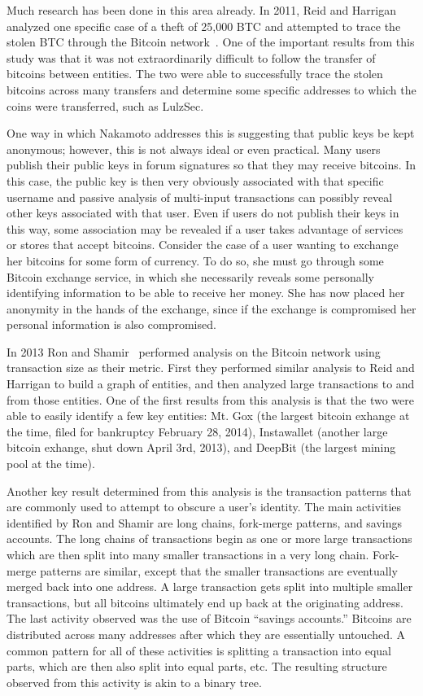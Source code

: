 \documentclass[11pt]{article}
\begin{document}
Much research has been done in this area already. In 2011, Reid and Harrigan
analyzed one specific case of a theft of 25,000 BTC and attempted to trace the
stolen BTC through the Bitcoin network~\cite{reid11}. One of the important
results from this study was that it was not extraordinarily difficult to follow
the transfer of bitcoins between entities. The two were able to successfully
trace the stolen bitcoins across many transfers and determine some specific
addresses to which the coins were transferred, such as LulzSec.

One way in which Nakamoto addresses this is suggesting that public keys be kept
anonymous; however, this is not always ideal or even practical. Many users
publish their public keys in forum signatures so that they may receive bitcoins.
In this case, the public key is then very obviously associated with that
specific username and passive analysis of multi-input transactions can possibly
reveal other keys associated with that user. Even if users do not publish their
keys in this way, some association may be revealed if a user takes advantage of
services or stores that accept bitcoins. Consider the case of a user wanting to
exchange her bitcoins for some form of currency. To do so, she must go through
some Bitcoin exchange service, in which she necessarily reveals some personally
identifying information to be able to receive her money. She has now placed her
anonymity in the hands of the exchange, since if the exchange is compromised
her personal information is also compromised.

In 2013 Ron and Shamir~\cite{ron13} performed analysis on the Bitcoin network
using transaction size as their metric. First they performed similar analysis to
Reid and Harrigan to build a graph of entities, and then analyzed large
transactions to and from those entities. One of the first results from this
analysis is that the two were able to easily identify a few key entities: Mt.
Gox (the largest bitcoin exhange at the time, filed for bankruptcy February 28,
2014), Instawallet (another large bitcoin exhange, shut down April 3rd, 2013),
and DeepBit (the largest mining pool at the time).

Another key result determined
from this analysis is the transaction patterns that are commonly used to attempt
to obscure a user's identity. The main activities identified by Ron and Shamir
are long chains, fork-merge patterns, and savings accounts. The long chains of
transactions begin as one or more large transactions which are then split into
many smaller transactions in a very long chain. Fork-merge patterns are similar,
except that the smaller transactions are eventually merged back into one
address. A large transaction gets split into multiple smaller transactions, but
all bitcoins ultimately end up back at the originating address. The last
activity observed was the use of Bitcoin ``savings accounts.'' Bitcoins are
distributed across many addresses after which they are essentially untouched. A
common pattern for all of these activities is splitting a transaction into equal
parts, which are then also split into equal parts, etc. The resulting structure
observed from this activity is akin to a binary tree.
\end{document}
